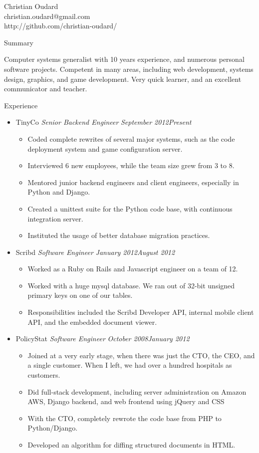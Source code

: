 \documentclass[11pt,oneside]{article}
\newenvironment{ressection}[1]{
    \textrm{\Large#1}
    \begin{itemize}
}{
    \end{itemize}
}
\newcommand{\ressubitem}[1]{
    \item \begin{flushleft} \textsf{#1} \end{flushleft}
}
\newcommand{\resbigitem}[3]{
    \item
    \textrm{#1}
    \hspace{5pt}
    \textit{#2}
    \hfill
    \textit{#3}
}
\newenvironment{ressubsec}[3]{
    \resbigitem{#1}{#2}{#3}
    \begin{itemize}
}{
    \end{itemize}
}
\begin{document}
\begin{center}
    \textrm{\Huge Christian Oudard} \\
    \vspace{4pt}
    \textsf{
        christian.oudard@gmail.com \\
        http://github.com/christian-oudard/
    }
\end{center}
\vspace{8pt} 

\textrm{\Large Summary}\par
\vspace{8pt}
\textsf{Computer systems generalist with 10 years experience, and numerous personal software projects. Competent in many areas, including web development, systems design, graphics, and game development. Very quick learner, and an excellent communicator and teacher.}
\vspace{12pt}

\begin{ressection}{Experience}

    \begin{ressubsec}{TinyCo}{Senior Backend Engineer}{September 2012\textendash Present}
        \ressubitem{Coded complete rewrites of several major systems, such as the code deployment system and game configuration server.}
        \ressubitem{Interviewed 6 new employees, while the team size grew from 3 to 8.}
        \ressubitem{Mentored junior backend engineers and client engineers, especially in Python and Django.}
        \ressubitem{Created a unittest suite for the Python code base, with continuous integration server.}
        \ressubitem{Instituted the usage of better database migration practices.}
    \end{ressubsec}

    \begin{ressubsec}{Scribd}{Software Engineer}{January 2012\textendash August 2012}
        \ressubitem{Worked as a Ruby on Rails and Javascript engineer on a team of 12.}
        \ressubitem{Worked with a huge mysql database. We ran out of 32-bit unsigned primary keys on one of our tables.}
        \ressubitem{Responsibilities included the Scribd Developer API, internal mobile client API, and the embedded document viewer.}
    \end{ressubsec}

    \begin{ressubsec}{PolicyStat}{Software Engineer}{October 2008\textendash January 2012}
        \ressubitem{Joined at a very early stage, when there was just the CTO, the CEO, and a single customer. When I left, we had over a hundred hospitals as customers.}
        \ressubitem{Did full-stack development, including server administration on Amazon AWS, Django backend, and web frontend using jQuery and CSS}
        \ressubitem{With the CTO, completely rewrote the code base from PHP to Python/Django.}
        \ressubitem{Developed an algorithm for diffing structured documents in HTML.}
    \end{ressubsec}

\end{ressection}
\end{document}
